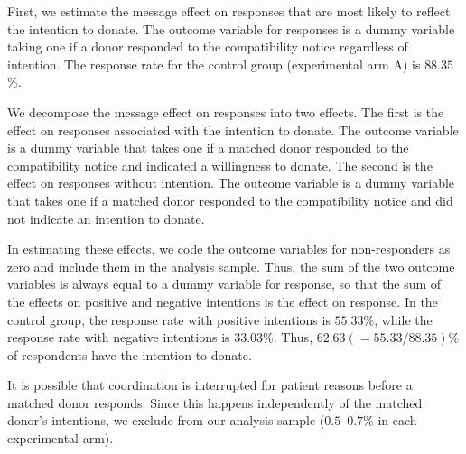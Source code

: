 \documentclass[
]{article}
\begin{document}
First, we estimate the message effect on responses that are most likely to reflect the intention to donate. The outcome variable for responses is a dummy variable taking one if a donor responded to the compatibility notice regardless of intention. The response rate for the control group (experimental arm A) is \(88.35\)\%.

We decompose the message effect on responses into two effects. The first is the effect on responses associated with the intention to donate. The outcome variable is a dummy variable that takes one if a matched donor responded to the compatibility notice and indicated a willingness to donate. The second is the effect on responses without intention. The outcome variable is a dummy variable that takes one if a matched donor responded to the compatibility notice and did not indicate an intention to donate.

In estimating these effects, we code the outcome variables for non-responders as zero and include them in the analysis sample. Thus, the sum of the two outcome variables is always equal to a dummy variable for response, so that the sum of the effects on positive and negative intentions is the effect on response. In the control group, the response rate with positive intentions is \(55.33\)\%, while the response rate with negative intentions is \(33.03\)\%. Thus, \(62.63(=55.33/88.35)\)\% of respondents have the intention to donate.

It is possible that coordination is interrupted for patient reasons before a matched donor responds. Since this happens independently of the matched donor's intentions, we exclude from our analysis sample (\(0.5\)--\(0.7\)\% in each experimental arm).
\end{document}
